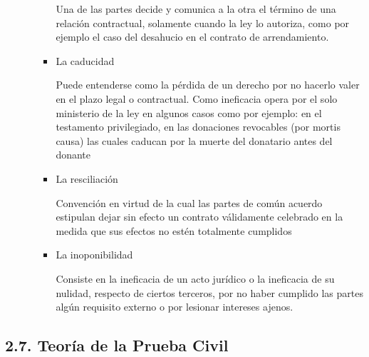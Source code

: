 \documentclass[]{article}
\begin{document}
\begin{itemize}
\begin{itemize}
\begin{itemize}
      Una de las partes decide y comunica a la otra el término de una
      relación contractual, solamente cuando la ley lo autoriza, como
      por ejemplo el caso del desahucio en el contrato de arrendamiento.
    \item
      La caducidad

      Puede entenderse como la pérdida de un derecho por no hacerlo
      valer en el plazo legal o contractual. Como ineficacia opera por
      el solo ministerio de la ley en algunos casos como por ejemplo: en
      el testamento privilegiado, en las donaciones revocables (por
      mortis causa) las cuales caducan por la muerte del donatario antes
      del donante
    \item
      La resciliación

      Convención en virtud de la cual las partes de común acuerdo
      estipulan dejar sin efecto un contrato válidamente celebrado en la
      medida que sus efectos no estén totalmente cumplidos
    \item
      La inoponibilidad

      Consiste en la ineficacia de un acto jurídico o la ineficacia de
      su nulidad, respecto de ciertos terceros, por no haber cumplido
      las partes algún requisito externo o por lesionar intereses
      ajenos.
    \end{itemize}
  \end{itemize}
\end{itemize}

\hypertarget{teoruxeda-de-la-prueba-civil}{%
\subsection{2.7. Teoría de la Prueba
Civil}\label{teoruxeda-de-la-prueba-civil}}
\end{document}
